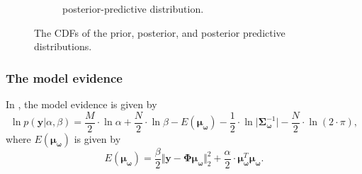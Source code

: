 \documentclass{article}
\begin{document}
\begin{figure}[htb!]
\begin{subfigure}[b]{0.3\textwidth}
         \caption{posterior-predictive distribution.}
     \end{subfigure}
     
     \caption{The CDFs of the prior, posterior, and posterior predictive distributions.}
     \label{fig:Q2_CDFs}
\end{figure}

\subsubsection{The model evidence}
In \citeauthor*{bishop2006} \cite{bishop2006}, the model evidence is given by
\begin{equation}
\ln p(\mathbf{y} \vert \alpha, \beta) = \frac{M}{2}\cdot \ln\alpha + \frac{N}{2}\cdot \ln \beta - E\left(\boldsymbol\mu_{\boldsymbol\omega}\right) - \frac{1}{2}\cdot \ln \vert \boldsymbol\Sigma^{-1}_{\boldsymbol\omega} \vert - \frac{N}{2}\cdot \ln (2 \cdot \pi),
\end{equation}
where $E\left(\boldsymbol\mu_{\boldsymbol\omega}\right)$ is given by
\begin{equation}
E\left(\boldsymbol\mu_{\boldsymbol\omega}\right) = \frac{\beta}{2} \Vert \mathbf{y} - \boldsymbol\Phi\boldsymbol\mu_{\boldsymbol\omega} \Vert_2^2 + \frac{\alpha}{2}\cdot \boldsymbol\mu_{\boldsymbol\omega}^T\boldsymbol\mu_{\boldsymbol\omega}.
\end{equation}
\end{document}
